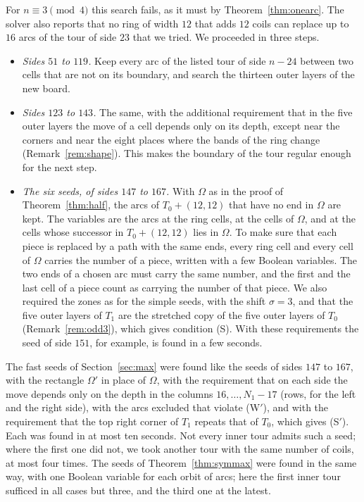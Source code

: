 \documentclass[11pt]{amsart}
\theoremstyle{remark}
\begin{document}
For $n\equiv3\pmod 4$ this search fails, as it must by Theorem~\ref{thm:onearc}. The solver also reports that no
ring of width $12$ that adds $12$ coils can replace up to $16$ arcs of the tour of side $23$ that we tried. We proceeded in three
steps.
\begin{itemize}
\item \emph{Sides $51$ to $119$.} Keep every arc of the listed tour of side $n-24$ between two cells that are not on
its boundary, and search the thirteen outer layers of the new board.
\item \emph{Sides $123$ to $143$.} The same, with the additional requirement that in the five outer layers the move
of a cell depends only on its depth, except near the corners and near the eight places where the bands of the ring
change (Remark~\ref{rem:shape}). This makes the boundary of the tour regular enough for the next step.
\item \emph{The six seeds, of sides $147$ to $167$.} With $\Omega$ as in the proof of Theorem~\ref{thm:half}, the
arcs of $T_0+(12,12)$ that have no end in $\Omega$ are kept. The variables are the arcs at the ring cells, at the
cells of $\Omega$, and at the cells whose successor in $T_0+(12,12)$ lies in $\Omega$. To make sure that each piece is replaced by a path with the same
ends, every ring cell and every cell of $\Omega$ carries the number of a piece, written with a few Boolean variables. The two ends
of a chosen arc must carry the same number, and the first and the last cell of a piece count as carrying the
number of that piece. We also required the zones as for the simple seeds, with the shift $\sigma=3$, and that the
five outer layers of $T_1$ are the stretched copy of the five outer layers of $T_0$ (Remark~\ref{rem:odd3}), which
gives condition (S). With these requirements the seed of side $151$, for example, is found in a few seconds.
\end{itemize}
The fast seeds of Section~\ref{sec:max} were found like the seeds of sides $147$ to $167$, with the rectangle $\Omega'$
in place of $\Omega$, with the requirement that on each side the move depends only on the depth in the columns
$16,\dots,N_1-17$ (rows, for the left and the right side), with the arcs excluded that violate (W$'$), and with the requirement that the top right corner of
$T_1$ repeats that of $T_0$, which gives (S$'$). Each was found in at most ten seconds. Not every inner tour admits
such a seed; where the first one did not, we took another tour with the same number of coils, at most four times.
The seeds of Theorem~\ref{thm:symmax} were found in the same way, with one Boolean variable for each orbit of arcs;
here the first inner tour sufficed in all cases but three, and the third one at the latest.
\end{document}
